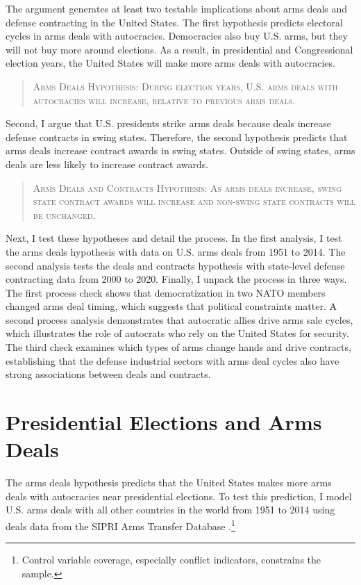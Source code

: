 \documentclass[12pt]{article}
\begin{document}
The argument generates at least two testable implications about arms deals and defense contracting in the United States. 
The first hypothesis predicts electoral cycles in arms deals with autocracies.
Democracies also buy U.S. arms, but they will not buy more around elections. 
As a result, in presidential and Congressional election years, the United States will make more arms deals with autocracies. 


\begin{quote}
\textsc{Arms Deals Hypothesis: During election years, U.S. arms deals with autocracies will increase, relative to previous arms deals.}
\end{quote}


Second, I argue that U.S. presidents strike arms deals because deals increase defense contracts in swing states.
Therefore, the second hypothesis predicts that arms deals increase contract awards in swing states.
Outside of swing states, arms deals are less likely to increase contract awards. 


\begin{quote}
\textsc{Arms Deals and Contracts Hypothesis: As arms deals increase, swing state contract awards will increase and non-swing state contracts will be unchanged.}
\end{quote}


Next, I test these hypotheses and detail the process. 
In the first analysis, I test the arms deals hypothesis with data on U.S. arms deals from 1951 to 2014.  
The second analysis tests the deals and contracts hypothesis with state-level defense contracting data from 2000 to 2020. 
Finally, I unpack the process in three ways.
The first process check shows that democratization in two NATO members changed arms deal timing, which suggests that political constraints matter. 
A second process analysis demonstrates that autocratic allies drive arms sale cycles, which illustrates the role of autocrats who rely on the United States for security. 
The third check examines which types of arms change hands and drive contracts, establishing that the defense industrial sectors with arms deal cycles also have strong associations between deals and contracts. 


\section{Presidential Elections and Arms Deals}


The arms deals hypothesis predicts that the United States makes more arms deals with autocracies near presidential elections.
To test this prediction, I model U.S. arms deals with all other countries in the world from 1951 to 2014 using deals data from the SIPRI Arms Transfer Database \citep{SIPRI2021}.\footnote{Control variable coverage, especially conflict indicators, constrains the sample.}
\end{document}
